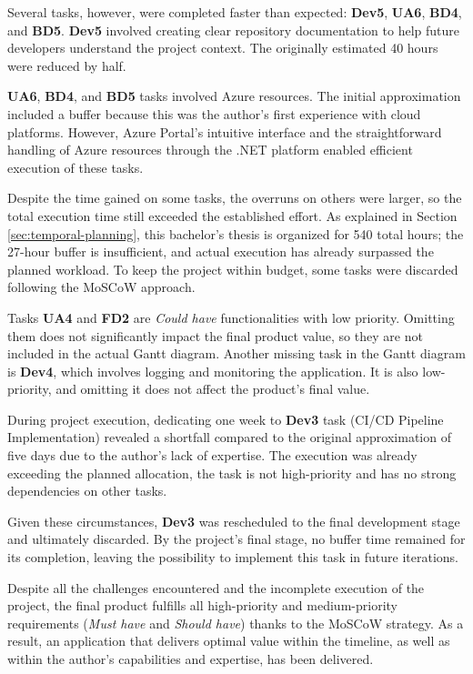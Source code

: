 Several tasks, however, were completed faster than expected: \textbf{Dev5}, \textbf{UA6}, \textbf{BD4}, and \textbf{BD5}. \textbf{Dev5} involved creating clear repository documentation to help future developers understand the project context. The originally estimated 40 hours were reduced by half. 

\textbf{UA6}, \textbf{BD4}, and \textbf{BD5} tasks involved Azure resources. The initial approximation included a buffer because this was the author's first experience with cloud platforms. However, Azure Portal's intuitive interface and the straightforward handling of Azure resources through the .NET platform enabled efficient execution of these tasks.

Despite the time gained on some tasks, the overruns on others were larger, so the total execution time still exceeded the established effort. As explained in Section \ref{sec:temporal-planning}, this bachelor's thesis is organized for 540 total hours; the 27-hour buffer is insufficient, and actual execution has already surpassed the planned workload. To keep the project within budget, some tasks were discarded following the MoSCoW approach.

Tasks \textbf{UA4} and \textbf{FD2} are \textit{Could have} functionalities with low priority. Omitting them does not significantly impact the final product value, so they are not included in the actual Gantt diagram. Another missing task in the Gantt diagram is \textbf{Dev4}, which involves logging and monitoring the application. It is also low-priority, and omitting it does not affect the product's final value.

During project execution, dedicating one week to \textbf{Dev3} task (CI/CD Pipeline Implementation) revealed a shortfall compared to the original approximation of five days due to the author's lack of expertise. The execution was already exceeding the planned allocation, the task is not high-priority and has no strong dependencies on other tasks.

Given these circumstances, \textbf{Dev3} was rescheduled to the final development stage and ultimately discarded. By the project's final stage, no buffer time remained for its completion, leaving the possibility to implement this task in future iterations.

Despite all the challenges encountered and the incomplete execution of the project, the final product fulfills all high-priority and medium-priority requirements (\textit{Must have} and \textit{Should have}) thanks to the MoSCoW strategy. As a result, an application that delivers optimal value within the timeline, as well as within the author's capabilities and expertise, has been delivered.
